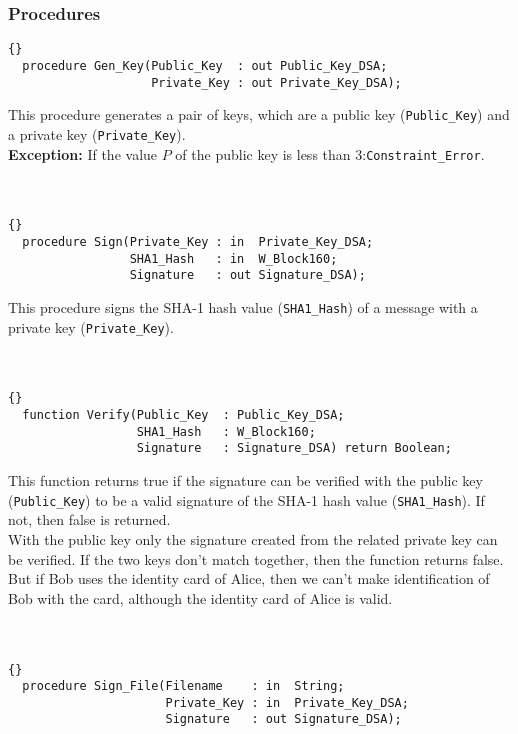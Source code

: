\subsubsection*{Procedures}
\begin{lstlisting}{}
  procedure Gen_Key(Public_Key  : out Public_Key_DSA;
                    Private_Key : out Private_Key_DSA);
\end{lstlisting}
This procedure generates a pair of keys, which are a public key (\texttt{Public\_Key}) and a private key (\texttt{Private\_Key}).\\
\textbf{Exception:} If the value $P$ of the public key is less than 3:\quad\texttt{Constraint\_Error}.\\
\hline \\ \ \\
\begin{lstlisting}{}
  procedure Sign(Private_Key : in  Private_Key_DSA;
                 SHA1_Hash   : in  W_Block160;
                 Signature   : out Signature_DSA);
\end{lstlisting}
This procedure signs the SHA-1 hash value (\texttt{SHA1\_Hash}) of a message with a private key (\texttt{Private\_Key}).\\
\hline \\ \ \\
\begin{lstlisting}{}
  function Verify(Public_Key  : Public_Key_DSA;
                  SHA1_Hash   : W_Block160;
                  Signature   : Signature_DSA) return Boolean;
\end{lstlisting}
This function returns true if the signature can be verified with the public key (\texttt{Public\_Key}) to be a valid signature of the SHA-1 hash value (\texttt{SHA1\_Hash}). If not, then false is returned.\\
With the public key only the signature created from the related private key can be verified. If the two keys don't match together, then the function returns false.\\
But if Bob uses the identity card of Alice, then we can't make identification of Bob with the card, although the identity card of Alice is valid.\\
\hline \\ \ \\
\begin{lstlisting}{}
  procedure Sign_File(Filename    : in  String;
                      Private_Key : in  Private_Key_DSA;
                      Signature   : out Signature_DSA);
\end{lstlisting}
